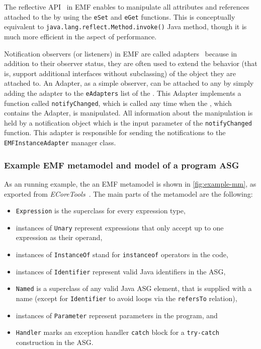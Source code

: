 The reflective API~\cite{EMFAPI} \label{sec:emf-reflection}in EMF enables to manipulate all attributes and references attached to the \eobject by using the \texttt{eSet} and \texttt{eGet} functions. This is conceptually equivalent to \texttt{java.lang.reflect.Method.invoke()} Java method, though it is much more efficient in the aspect of performance.
	
 Notification observers (or listeners) in EMF are called adapters~\cite{EMFAdapter} because in addition to their observer status, they are often used to extend the behavior (that is, support additional interfaces without subclassing) of the object they are attached to. An Adapter, as a simple observer, can be attached to any \eobject by simply adding the adapter to the \texttt{eAdapters} list of the \eobject. This Adapter implements a function called \texttt{notifyChanged}, which is called any time when the \eobject, which contains the Adapter, is manipulated. All information about the manipulation is held by a notification object which is the input parameter of the \texttt{notifyChanged} function. This adapter is responsible for sending the notifications to the \texttt{EMFInstanceAdapter} manager class.



\subsubsection{Example EMF metamodel and model of a program ASG}

As an running example, the an EMF metamodel is shown in \autoref{fig:example-mm}, as exported from \emph{ECoreTools}~\cite{ecoretools}. The main parts of the metamodel are the following:

\begin{itemize}
	\item \texttt{Expression} is the superclass for every expression type,
	
	\newcommand{\javaCode}[1]{\lstinline[language=java,keepspaces=true,basicstyle=\ttfamily]!#1!}
	
	
	\item instances of \texttt{Unary} represent expressions that only accept up to one expression as their operand,
	\item instances of \texttt{InstanceOf} stand for \texttt{instanceof} operators in the code,
	\item instances of \texttt{Identifier} represent valid Java identifiers in the ASG,
	\item \texttt{Named} is a superclass of any valid Java ASG element, that is supplied with a name (except for \texttt{Identifier} to avoid loops via the \texttt{refersTo} relation),
	\item instances of \texttt{Parameter} represent parameters in the program, and
	\item \texttt{Handler} marks an exception handler \texttt{catch} block for a \texttt{try-catch} construction in the ASG.
\end{itemize}

